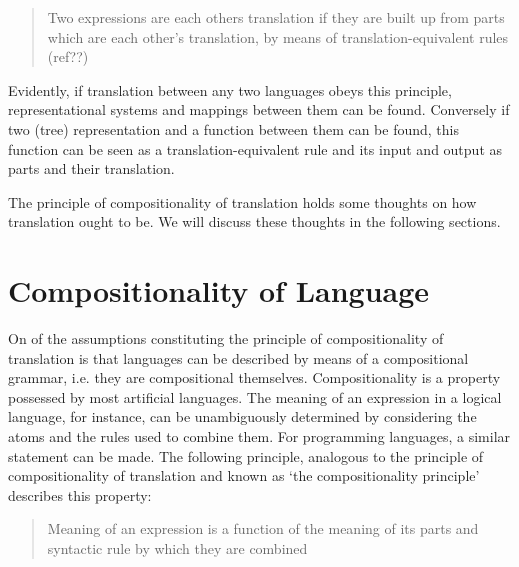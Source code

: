 \documentclass{report}
\theoremstyle{definition}
\theoremstyle{plain}
\begin{document}
\begin{quote}
Two expressions are each others translation if they are built up from parts which are each other's translation, by means of translation-equivalent rules (ref??)
\end{quote}

Evidently, if translation between any two languages obeys this principle, representational systems and mappings between them can be found. Conversely if two (tree) representation and a function between them can be found, this function can be seen as a translation-equivalent rule and its input and output as parts and their translation.

The principle of compositionality of translation holds some thoughts on how translation ought to be. We will discuss these thoughts in the following sections.


\section{Compositionality of Language}

On of the assumptions constituting the principle of compositionality of translation is that languages can be described by means of a compositional grammar, i.e. they are compositional themselves. Compositionality is a property possessed by most artificial languages. The meaning of an expression in a logical language, for instance, can be unambiguously determined by considering the atoms and the rules used to combine them. For programming languages, a similar statement can be made. The following principle, analogous to the principle of compositionality of translation and known as `the compositionality principle' describes this property:

\begin{quote}
Meaning of an expression is a function of the meaning of its parts and syntactic rule by which they are combined \cite{partee1984compositionality}
\end{quote}
\end{document}
